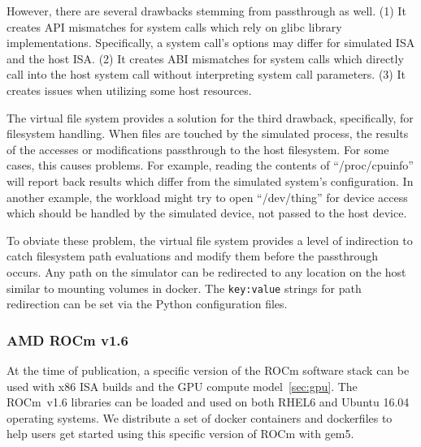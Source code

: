 However, there are several drawbacks stemming from passthrough as well. (1) It creates API mismatches for system calls which rely on glibc library implementations. Specifically, a system call's options may differ for simulated ISA and the host ISA. (2) It creates ABI mismatches for system calls which directly call into the host system call without interpreting system call parameters. (3) It creates issues when utilizing some host resources.

The virtual file system provides a solution for the third drawback, specifically, for filesystem handling.
When files are touched by the simulated process, the results of the accesses or modifications passthrough to the host filesystem.
For some cases, this causes problems.
For example, reading the contents of ``/proc/cpuinfo'' will report back results which differ from the simulated system's configuration.
In another example, the workload might try to open ``/dev/thing'' for device access which should be handled by the simulated device, not passed to the host device.

To obviate these problem, the virtual file system provides a level of indirection to catch filesystem path evaluations and modify them before the passthrough occurs.
Any path on the simulator can be redirected to any location on the host similar to mounting volumes in docker.
The \verb|key:value| strings for path redirection can be set via the Python configuration files.

\subsubsection{AMD ROCm v1.6}

At the time of publication, a specific version of the ROCm software stack can be used with x86 ISA builds and the GPU compute model~\ref{sec:gpu}.
The ROCm~v1.6 libraries can be loaded and used on both RHEL6 and Ubuntu 16.04 operating systems.
We distribute a set of docker containers and dockerfiles to help users get started using this specific version of ROCm with gem5.
